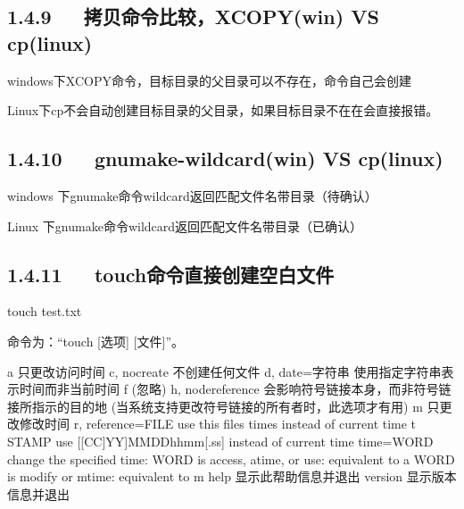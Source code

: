 \documentclass[letterpaper,12pt,english]{sphinxmanual}
\begin{document}
\begin{sphinxVerbatim}[commandchars=\\\{\}]
   
\end{sphinxVerbatim}


\subsection{1.4.9   拷贝命令比较，XCOPY(win) VS cp(linux)}
\label{\detokenize{001software/001install/linux:xcopy-win-vs-cp-linux}}
windows下XCOPY命令，目标目录的父目录可以不存在，命令自己会创建

Linux下cp不会自动创建目标目录的父目录，如果目标目录不在在会直接报错。


\subsection{1.4.10   gnumake-wildcard(win) VS cp(linux)}
\label{\detokenize{001software/001install/linux:gnumake-wildcard-win-vs-cp-linux}}
windows 下gnumake命令wildcard返回匹配文件名带目录（待确认）

Linux 下gnumake命令wildcard返回匹配文件名带目录（已确认）


\subsection{1.4.11   touch命令直接创建空白文件}
\label{\detokenize{001software/001install/linux:id27}}

touch test.txt

命令为：“touch {[}选项{]} {[}文件{]}”。

\begin{sphinxVerbatim}[commandchars=\\\{\}]
\PYGZhy{}a   只更改访问时间
\PYGZhy{}c, \PYGZhy{}\PYGZhy{}no\PYGZhy{}create 不创建任何文件
\PYGZhy{}d, \PYGZhy{}\PYGZhy{}date=字符串 使用指定字符串表示时间而非当前时间
\PYGZhy{}f   (忽略)
\PYGZhy{}h, \PYGZhy{}\PYGZhy{}no\PYGZhy{}dereference  会影响符号链接本身，而非符号链接所指示的目的地
  (当系统支持更改符号链接的所有者时，此选项才有用)
\PYGZhy{}m   只更改修改时间
\PYGZhy{}r, \PYGZhy{}\PYGZhy{}reference=FILE  use this file\PYGZsq{}s times instead of current time
\PYGZhy{}t STAMP              use [[CC]YY]MMDDhhmm[.ss] instead of current time
    \PYGZhy{}\PYGZhy{}time=WORD        change the specified time:
                        WORD is access, atime, or use: equivalent to \PYGZhy{}a
                        WORD is modify or mtime: equivalent to \PYGZhy{}m
    \PYGZhy{}\PYGZhy{}help  显示此帮助信息并退出
    \PYGZhy{}\PYGZhy{}version  显示版本信息并退出
\end{sphinxVerbatim}
\end{document}
